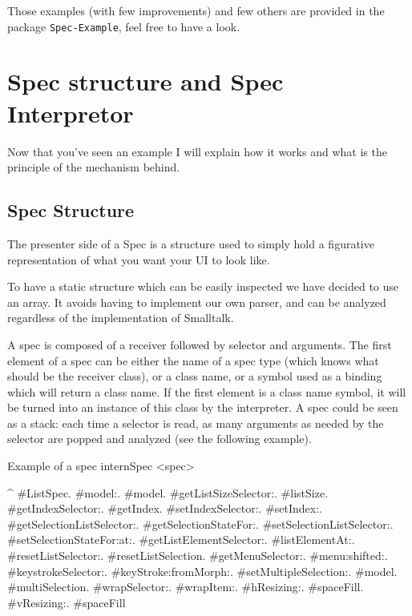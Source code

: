 \documentclass[a4paper,10pt,twoside]{book}
\begin{document}
Those examples (with few improvements) and few others are provided in the package \verb+Spec-Example+, feel free to have a look.

\section{Spec structure and Spec Interpretor}

Now that you've seen an example I will explain how it works and what is the principle of the mechanism behind.

\subsection{Spec Structure}\label{spec_structure}

The presenter side of a Spec is a structure used to simply hold a figurative representation of what you want your UI to look like. 

To have a static structure which can be easily inspected we have decided to use an array. It avoids having to implement our own parser, and can be analyzed regardless of the implementation of Smalltalk.

A spec is composed of a receiver followed by selector and arguments.
The first element of a spec can be either the name of a spec type (which knows what should be the receiver class), or a class name, or a symbol used as a binding which will return a class name. If the first element is a class name symbol, it will be turned into an instance of this class by the interpreter. A spec could be seen as a stack: each time a selector is read, as many arguments as needed by the selector are popped and analyzed (see the following example).

\begin{method}{Example of a spec}
internSpec
	<spec>
	
	^ {#ListSpec.	
               #model:.                                        #model.
               #getListSizeSelector:.                   #listSize.
               #getIndexSelector:.                       #getIndex.
               #setIndexSelector:.                       #setIndex:.
               #getSelectionListSelector:.	         #getSelectionStateFor:.
               #setSelectionListSelector:.	         #setSelectionStateFor:at:.
               #getListElementSelector:. 	        #listElementAt:.
               #resetListSelector:.                       #resetListSelection.
               #getMenuSelector:.	                   #menu:shifted:.
               #keystrokeSelector:.                     #keyStroke:fromMorph:.
               #setMultipleSelection:.	               {#model. #multiSelection}.
               #wrapSelector:.                            #wrapItem:.
               #hResizing:.                                 #spaceFill.
               #vResizing:.                                 #spaceFill}
\end{method} 
\end{document}
